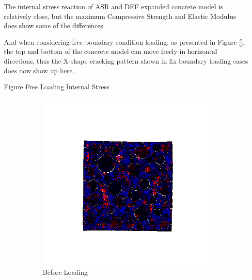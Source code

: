 The internal stress reaction of ASR and DEF expanded concrete model is relatively close, but the maximum Compressive Strength and Elastic Modulus does show some of the differences.

And when considering free boundary condition loading, as presented in Figure \ref{}, the top and bottom of the concrete model can move freely in horizontal directions, thus the X-shape cracking pattern shown in fix boundary loading cases does now show up here.


Figure Free Loading Internal Stress


\begin{figure}[ht]
\centering

    \begin{subfigure}{.33\textwidth}
      \centering
      \includegraphics[width=1.0\linewidth]{Files/A30P75_3_IS/DEP50-STEP(020).png}
      \caption{Before Loading}
    \end{subfigure}%
    \begin{subfigure}{.33\textwidth}
      \centering

\end{subfigure}
\end{figure}
